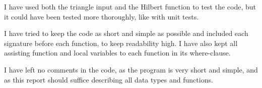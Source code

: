 \documentclass[a4paper, 10pt]{article}
\begin{document}
I have used both the triangle input and the Hilbert function to test the code, but it could have been tested more thoroughly, like with unit tests.

I have tried to keep the code as short and simple as possible and included each signature before each function, to keep readability high. I have also kept all assisting function and local variables to each function in its where-clause.

I have left no comments in the code, as the program is very short and simple, and as this report should suffice describing all data types and functions.
\end{document}
